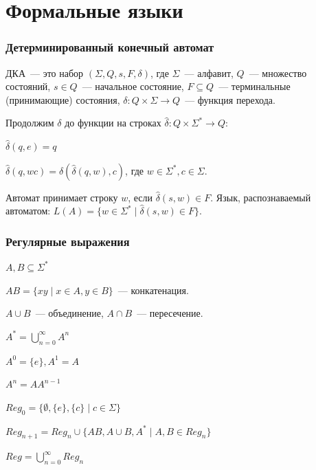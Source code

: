 \documentclass[12pt]{article}
\begin{document}
	\tableofcontents
	\setcounter{tocdepth}{3}
	\newpage
	
	\part{Формальные языки}
	
	\section{Детерминированный конечный автомат}
	
	\begin{definition}
		ДКА~--- это набор $(\Sigma, Q, s, F, \delta)$, где $\Sigma$~--- алфавит, $Q$~--- множество состояний, $s \in Q$~--- начальное состояние, $F \subseteq Q$~--- терминальные (принимающие) состояния, $\delta: Q \times \Sigma \rightarrow Q$~--- функция перехода.
	\end{definition}
	
	\begin{definition}
		Продолжим $\delta$ до функции на строках $\hat\delta: Q \times \Sigma^* \rightarrow Q$:
		
		$\hat\delta(q, e) = q$
		
		$\hat\delta(q, wc) = \delta(\hat\delta(q, w), c)$, где $w \in \Sigma^*, c \in \Sigma$.
		
		Автомат принимает строку $w$, если $\hat\delta(s, w) \in F$. Язык, распознаваемый автоматом: $L(A) = \{ w \in \Sigma^* \mid \hat\delta(s, w) \in F \}$.
	\end{definition}
	
	\section{Регулярные выражения}
	
	\begin{definition}
		$A, B \subseteq \Sigma^*$
		
		$AB = \{ xy \mid x \in A, y \in B \}$~--- конкатенация.
		
		$A \cup B$~--- объединение, $A \cap B$~--- пересечение.
		
		$A^* = \bigcup\limits_{n = 0}^\infty A^n$
		
		$A^0 = \{ e \}, A^1 = A$
		
		$A^n = AA^{n - 1}$
	\end{definition}
	
	\begin{definition}
		$Reg_0 = \{ \emptyset, \{ e \}, \{ c \} \mid c \in \Sigma \}$
		
		$Reg_{n + 1} = Reg_n \cup \{ AB, A \cup B, A^* \mid A, B \in Reg_n \}$
		
		$Reg = \bigcup\limits_{n = 0}^\infty Reg_n$
	\end{definition}
	
\end{document}
